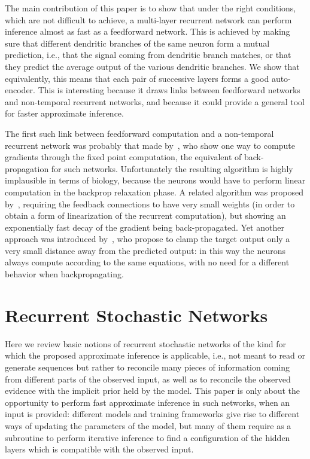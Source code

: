 \documentclass{article}
\begin{document}
The main contribution of this paper is to show that under the right
conditions, which are not difficult to achieve, a multi-layer recurrent
network can perform inference almost as fast as a feedforward network.
This is achieved by making sure that different dendritic branches
of the same neuron form a mutual prediction, i.e., that the signal coming
from dendritic branch matches, or that they predict
the average output of the various dendritic branches. We show that equivalently, this means that
each pair of successive layers forms a good auto-encoder.
This is interesting because it draws links between feedforward
networks and non-temporal recurrent networks, and because it could provide a
general tool for faster approximate inference.

The first such link between feedforward computation and a non-temporal recurrent network
was probably that made by~\citet{Pineda87,Almeida87}, who show one way to compute gradients
  through the fixed point computation, the equivalent of back-propagation
  for such networks. Unfortunately the resulting algorithm is highly implausible in terms of biology,
  because the neurons would have to perform linear computation in the backprop relaxation phase.
  A related algorithm was proposed by~\cite{Xie+Seung-2003}, requiring the feedback connections
  to have very small weights (in order to obtain a form of linearization of the recurrent computation),
  but showing an exponentially fast decay of the gradient being back-propagated.
  Yet another approach was introduced by~\citet{Scellier+Bengio-arxiv2016}, who propose
  to clamp the target output only a very small distance away from the predicted output:
  in this way the neurons always compute according to the same equations, with no
  need for a different behavior when backpropagating.

\section{Recurrent Stochastic Networks}

Here we review basic notions of recurrent stochastic networks of the kind
for which the proposed approximate inference is applicable, i.e., not meant
to read or generate sequences but rather to reconcile many pieces of information
coming from different parts of the observed input, as well as to reconcile
the observed evidence with the implicit prior held by the model. This paper
is only about the opportunity to perform fast approximate inference in such
networks, when an input is provided: different models and training
frameworks give rise to different ways of updating the parameters of the
model, but many of them require as a subroutine to perform iterative
inference to find a configuration of the hidden layers which is compatible
with the observed input.
\end{document}
